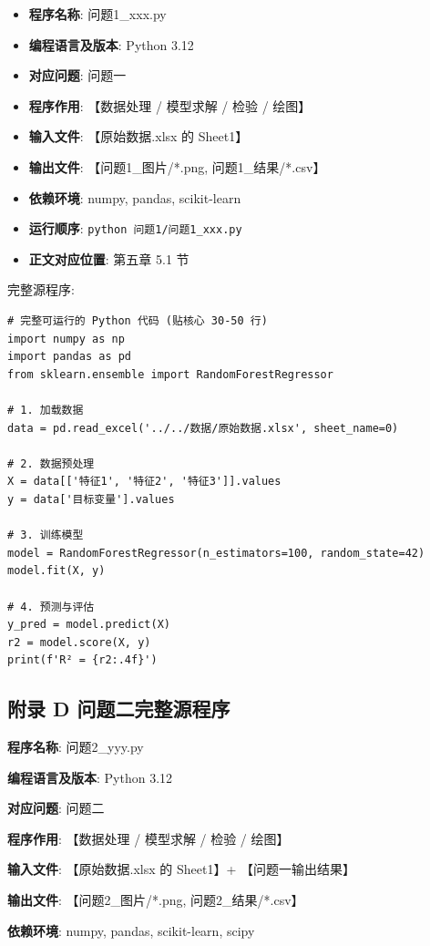 \begin{itemize}
  \item \textbf{程序名称}: 问题1\_xxx.py
  \item \textbf{编程语言及版本}: Python 3.12
  \item \textbf{对应问题}: 问题一
  \item \textbf{程序作用}: 【数据处理 / 模型求解 / 检验 / 绘图】
  \item \textbf{输入文件}: 【原始数据.xlsx 的 Sheet1】
  \item \textbf{输出文件}: 【问题1\_图片/*.png, 问题1\_结果/*.csv】
  \item \textbf{依赖环境}: numpy, pandas, scikit-learn
  \item \textbf{运行顺序}: \texttt{python 问题1/问题1\_xxx.py}
  \item \textbf{正文对应位置}: 第五章 5.1 节
\end{itemize}

完整源程序:
\begin{verbatim}
# 完整可运行的 Python 代码 (贴核心 30-50 行)
import numpy as np
import pandas as pd
from sklearn.ensemble import RandomForestRegressor

# 1. 加载数据
data = pd.read_excel('../../数据/原始数据.xlsx', sheet_name=0)

# 2. 数据预处理
X = data[['特征1', '特征2', '特征3']].values
y = data['目标变量'].values

# 3. 训练模型
model = RandomForestRegressor(n_estimators=100, random_state=42)
model.fit(X, y)

# 4. 预测与评估
y_pred = model.predict(X)
r2 = model.score(X, y)
print(f'R² = {r2:.4f}')
\end{verbatim}

\subsection*{附录 D \quad 问题二完整源程序}

\textbf{程序名称}: 问题2\_yyy.py

\textbf{编程语言及版本}: Python 3.12

\textbf{对应问题}: 问题二

\textbf{程序作用}: 【数据处理 / 模型求解 / 检验 / 绘图】

\textbf{输入文件}: 【原始数据.xlsx 的 Sheet1】+ 【问题一输出结果】

\textbf{输出文件}: 【问题2\_图片/*.png, 问题2\_结果/*.csv】

\textbf{依赖环境}: numpy, pandas, scikit-learn, scipy


